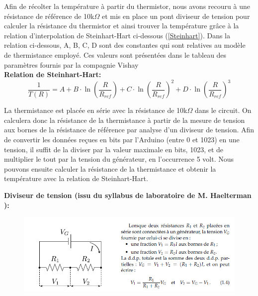 \documentclass[12pt]{report}
\begin{document}
Afin de récolter la température à partir du thermistor, nous avons recouru à une résistance de référence de 10k$\Omega$ et mis en place un pont diviseur de tension pour calculer la résistance du thermistor \cite{_types_????} et ainsi trouver la température grâce à la relation d’interpolation de Steinhart-Hart ci-dessous (\ref{Steinhart}). Dans la relation ci-dessous, A, B, C, D sont des constantes qui sont relatives au modèle de thermistance employé. Ces valeurs sont pr\'{e}sent\'{e}es dans le tableau des paramètres fournis par la compagnie Vishay\cite{100.pdf_????}\\

\vspace{0.5cm}
\textbf{Relation de Steinhart-Hart:}
\begin{equation}
\frac{1}{T(R)}=A+B\cdot\ln(\frac{R}{R_{ref}})+C\cdot\ln(\frac{R}{R_{ref}})^2+D\cdot\ln(\frac{R}{R_{ref}})^3
\label{Steinhart}
\end{equation}

\vspace{0.5cm}
La thermistance est plac\'{e}e en série avec la r\'{e}sistance de 10k$\Omega$ dans le circuit. On calculera donc la r\'{e}sistance de la thermistance à partir de la mesure de tension aux bornes de la résistance de référence par analyse d’un diviseur de tension. 
Afin de convertir les données reçues en bits par l'Arduino (entre 0 et 1023) en une tension, il suffit de la diviser par la valeur maximale en bits, 1023, et de multiplier le tout par la tension du générateur, en l'occurrence 5 volt. Nous pouvons ensuite calculer la résistance de la thermistance et obtenir la température avec la relation de Steinhart-Hart.\\
\vspace{0.5cm}

\textbf{Diviseur de tension (issu du syllabus de laboratoire de M. Haelterman \cite{haelterman_marc_physique_2014}):}

\begin{figure}[H]
\centering
\includegraphics[scale=0.8]{divt.PNG}
\end{figure}
\end{document}
